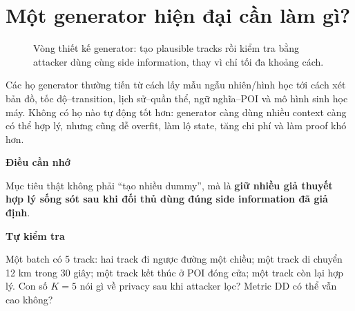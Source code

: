 \documentclass[11pt,a4paper,oneside]{report}
\newenvironment{takeaway}[1][Điều cần nhớ]{%
  \par\medskip\noindent\begin{lrbox}{\takeawaystore}\begin{minipage}{.89\textwidth}
  {\sffamily\bfseries\color{blue}#1}\par\smallskip}{%
  \end{minipage}\end{lrbox}\begin{center}\setlength{\fboxsep}{7pt}%
  \fcolorbox{blue}{lightblue}{\usebox{\takeawaystore}}\end{center}\medskip}
\newenvironment{exercisebox}[1][Tự kiểm tra]{%
  \par\medskip\noindent\begin{lrbox}{\exercisestore}\begin{minipage}{.89\textwidth}
  {\sffamily\bfseries\color{amber}#1}\par\smallskip}{%
  \end{minipage}\end{lrbox}\begin{center}\setlength{\fboxsep}{7pt}%
  \fcolorbox{amber}{lightamber}{\usebox{\exercisestore}}\end{center}\medskip}
\begin{document}
\section{Một generator hiện đại cần làm gì?}

\begin{figure}[htbp]
\centering
{}
\caption{Vòng thiết kế generator: tạo plausible tracks rồi kiểm tra bằng attacker dùng cùng side information, thay vì chỉ tối đa khoảng cách.}
\label{fig:generator-loop}
\end{figure}

Các họ generator thường tiến từ cách lấy mẫu ngẫu nhiên/hình học tới cách xét bản
đồ, tốc độ--transition, lịch sử--quần thể, ngữ nghĩa--POI và mô hình sinh học máy.
Không có họ nào tự động tốt hơn: generator càng dùng nhiều context càng có thể
hợp lý, nhưng cũng dễ overfit, làm lộ state, tăng chi phí và làm proof khó hơn.

\begin{takeaway}
Mục tiêu thật không phải ``tạo nhiều dummy'', mà là \textbf{giữ nhiều giả thuyết
hợp lý sống sót sau khi đối thủ dùng đúng side information đã giả định}.
\end{takeaway}

\begin{exercisebox}
Một batch có 5 track: hai track đi ngược đường một chiều; một track di chuyển
12 km trong 30 giây; một track kết thúc ở POI đóng cửa; một track còn lại hợp lý.
Con số $K=5$ nói gì về privacy sau khi attacker lọc? Metric DD có thể vẫn cao không?
\end{exercisebox}
\end{document}
